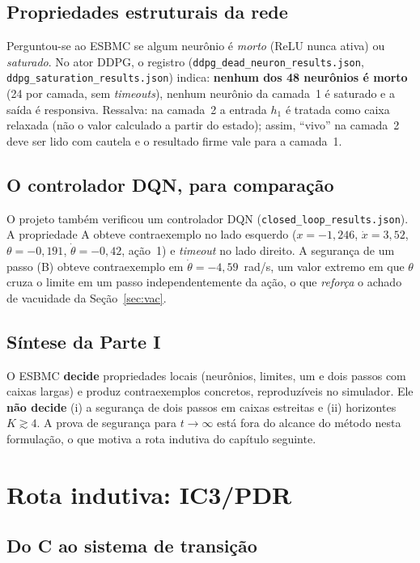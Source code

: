\documentclass[12pt,openright,oneside,a4paper,chapter=TITLE,sumario=tradicional,english,brazil]{abntex2}
\begin{document}
\subsection{Propriedades estruturais da rede}

Perguntou-se ao ESBMC se algum neurônio é \emph{morto} (ReLU nunca ativa) ou \emph{saturado}. No ator DDPG, o registro (\texttt{ddpg\_dead\_neuron\_results.json}, \texttt{ddpg\_saturation\_results.json}) indica: \textbf{nenhum dos 48 neurônios é morto} (24 por camada, sem \emph{timeouts}), nenhum neurônio da camada~1 é saturado e a saída é responsiva. Ressalva: na camada~2 a entrada $h_1$ é tratada como caixa relaxada (não o valor calculado a partir do estado); assim, ``vivo'' na camada~2 deve ser lido com cautela e o resultado firme vale para a camada~1.

\subsection{O controlador DQN, para comparação}

O projeto também verificou um controlador DQN (\texttt{closed\_loop\_results.json}). A propriedade A obteve contraexemplo no lado esquerdo ($x{=}-1{,}246$, $\dot x{=}3{,}52$, $\theta{=}-0{,}191$, $\dot\theta{=}-0{,}42$, ação~1) e \emph{timeout} no lado direito. A segurança de um passo (B) obteve contraexemplo em $\dot\theta=-4{,}59$~rad/s, um valor extremo em que $\theta$ cruza o limite em um passo independentemente da ação, o que \emph{reforça} o achado de vacuidade da Seção~\ref{sec:vac}.

\subsection{Síntese da Parte I}

O ESBMC \textbf{decide} propriedades locais (neurônios, limites, um e dois passos com caixas largas) e produz contraexemplos concretos, reproduzíveis no simulador. Ele \textbf{não decide} (i) a segurança de dois passos em caixas estreitas e (ii) horizontes $K\gtrsim4$. A prova de segurança para $t\to\infty$ está fora do alcance do método nesta formulação, o que motiva a rota indutiva do capítulo seguinte.

\section{Rota indutiva: IC3/PDR}\label{cap:ic3}

\subsection{Do C ao sistema de transição}
\end{document}
